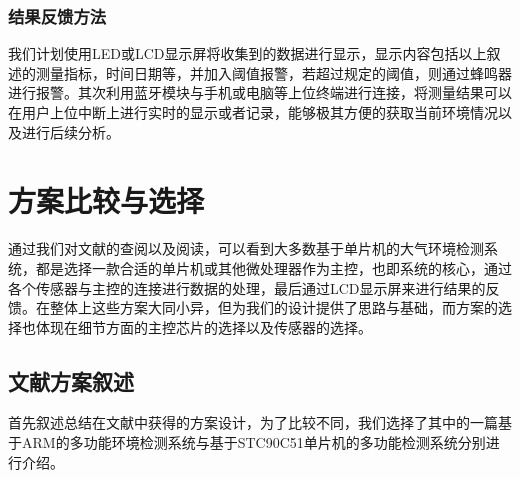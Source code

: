 \documentclass[a4paper, 11pt]{article} %
\begin{document}
\subsubsection{结果反馈方法}
\par{} 我们计划使用LED或LCD显示屏将收集到的数据进行显示，显示内容包括以上叙述的测量指标，时间日期等，并加入阈值报警，若超过规定的阈值，则通过蜂鸣器进行报警。其次利用蓝牙模块与手机或电脑等上位终端进行连接，将测量结果可以在用户上位中断上进行实时的显示或者记录，能够极其方便的获取当前环境情况以及进行后续分析。

\section{方案比较与选择}
\label{sect1}

\par{} 通过我们对文献的查阅以及阅读，可以看到大多数基于单片机的大气环境检测系统，都是选择一款合适的单片机或其他微处理器作为主控，也即系统的核心，通过各个传感器与主控的连接进行数据的处理，最后通过LCD显示屏来进行结果的反馈。在整体上这些方案大同小异，但为我们的设计提供了思路与基础，而方案的选择也体现在细节方面的主控芯片的选择以及传感器的选择。
\subsection{文献方案叙述}

\par{} 首先叙述总结在文献中获得的方案设计，为了比较不同，我们选择了其中的一篇基于ARM的多功能环境检测系统与基于STC90C51单片机的多功能检测系统分别进行介绍。
\end{document}
